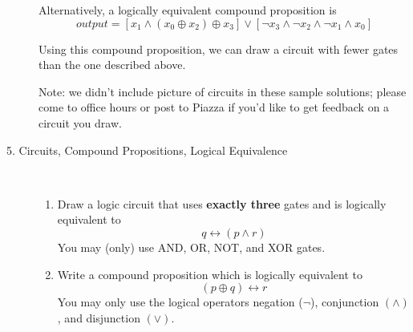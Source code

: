 \documentclass[12pt, oneside]{article}
\newif \ifsolution
\newcommand{\sol}[1]{\medskip\fbox{\begin{minipage}{5.5in}{#1}\end{minipage}}\medskip}
\begin{document}
\begin{description}
{{Alternatively, a  logically equivalent compound proposition is
\[
output = \left [ x_1 \wedge ( x_0 \oplus x_2) \oplus x_3 \right] \vee \left [ \neg x_3 \wedge \neg x_2 \wedge \neg x_1 \wedge x_0 \right]
\]

Using this compound proposition, we can draw a circuit with fewer gates than the one described above.

Note: we didn't include picture of circuits in these sample solutions; 
please come to office hours or post to Piazza if you'd like to get feedback 
on a circuit you draw.
}}
\fi


\item[5. Circuits, Compound Propositions, Logical Equivalence] \qquad \\
\begin{enumerate}\item Draw a logic circuit that uses 
{\bf exactly three} gates and is logically equivalent to
\[
q \leftrightarrow (p \wedge r)
\]
You may (only) use AND, OR, NOT, and XOR gates.

\ifsolution{
\sol{
Since XOR gates are available, we can use a convenient relationship between XOR and $\leftrightarrow$:
\[
q \leftrightarrow (p \wedge r) \equiv \neg ( q \oplus (p \land r) )
\]
Implementing this compound proposition as a circuit, we will use one XOR gate, one AND gate, and
one NOT gate, as required.

Note: we didn't include picture of circuits in these sample solutions; 
please come to office hours or post to Piazza if you'd like to get feedback 
on a circuit you draw.
}}
\fi


\item Write a compound proposition which is logically equivalent to
\[
(p \oplus q) \leftrightarrow r
\] 
You may only use the logical operators negation ($\neg$),
conjunction $(\wedge)$, and disjunction $(\vee)$.

\ifsolution{
\sol{ We apply several logical equivalences in turn: first, we can rewrite $\leftrightarrow$ in terms of 
$\land$ and $\to$:
\[
(p \oplus q) \leftrightarrow r \equiv (~ (p \oplus q) \to r~) \land (~r \to (p \oplus q)~)
\]
Now, we replace $\to$ by its equivalent disjunctive form: $HYP \to CONC \equiv (\neg HYP) \vee CONC$.
Thus, 
\[
(~ (p \oplus q) \to r~) \land (~r \to (p \oplus q)~) \equiv (~ \neg (p \oplus q) \vee r~) \land (~\neg r \vee (p \oplus q)~)
\]
Last, we replace the XOR with equivalent compound propositions in terms of the other connectives:
the XOR is true means one of its inputs is T and the other F; the XOR is false means its inputs are both T or both F.
\begin{align*}
&  (~ \neg (p \oplus q) \vee r~) \land (~\neg r \vee (p \oplus q)~) \equiv \\
&(~ ( (p \land q) \vee (\neg p \land \neg q) ) \vee r~) \land (~\neg r \vee ( ( p \land \neg q) \vee (\neg p \land q)) ~)
\end{align*}
}}
\fi


\end{enumerate}
\end{description}
\end{document}
